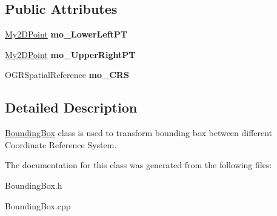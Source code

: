 \subsection*{Public Attributes}
\begin{DoxyCompactItemize}
\item 
\hypertarget{classBoundingBox_a62cde2273c991daf92f117cc39c08bb5}{
\hyperlink{classMy2DPoint}{My2DPoint} {\bfseries mo\_\-LowerLeftPT}}
\label{classBoundingBox_a62cde2273c991daf92f117cc39c08bb5}

\item 
\hypertarget{classBoundingBox_a8213e23e550950f7275b95bc35d471c5}{
\hyperlink{classMy2DPoint}{My2DPoint} {\bfseries mo\_\-UpperRightPT}}
\label{classBoundingBox_a8213e23e550950f7275b95bc35d471c5}

\item 
\hypertarget{classBoundingBox_aeb29cdab6d612ff354b0d8f6fd20edd4}{
OGRSpatialReference {\bfseries mo\_\-CRS}}
\label{classBoundingBox_aeb29cdab6d612ff354b0d8f6fd20edd4}

\end{DoxyCompactItemize}


\subsection{Detailed Description}
\hyperlink{classBoundingBox}{BoundingBox} class is used to transform bounding box between different Coordinate Reference System. 

The documentation for this class was generated from the following files:\begin{DoxyCompactItemize}
\item 
BoundingBox.h\item 
BoundingBox.cpp\end{DoxyCompactItemize}
